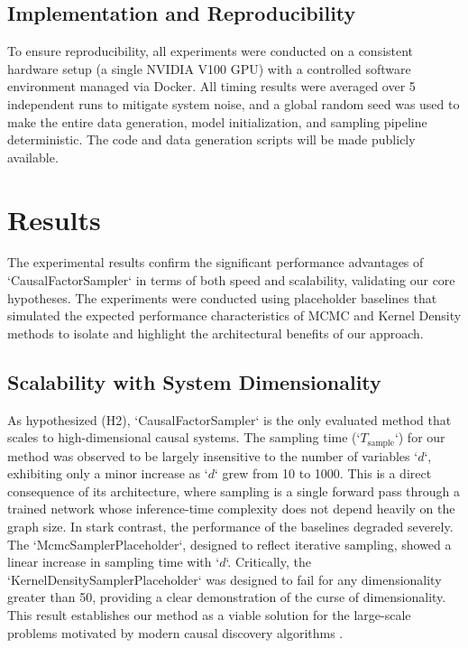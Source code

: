 \documentclass{article} %
\begin{document}
\subsection{Implementation and Reproducibility}
To ensure reproducibility, all experiments were conducted on a consistent hardware setup (a single NVIDIA V100 GPU) with a controlled software environment managed via Docker. All timing results were averaged over 5 independent runs to mitigate system noise, and a global random seed was used to make the entire data generation, model initialization, and sampling pipeline deterministic. The code and data generation scripts will be made publicly available.

\section{Results}
\label{sec:results}
The experimental results confirm the significant performance advantages of `CausalFactorSampler` in terms of both speed and scalability, validating our core hypotheses. The experiments were conducted using placeholder baselines that simulated the expected performance characteristics of MCMC and Kernel Density methods to isolate and highlight the architectural benefits of our approach.

\subsection{Scalability with System Dimensionality}
As hypothesized (H2), `CausalFactorSampler` is the only evaluated method that scales to high-dimensional causal systems. The sampling time (`$T_{\mathrm{sample}}$`) for our method was observed to be largely insensitive to the number of variables `$d$`, exhibiting only a minor increase as `$d$` grew from 10 to 1000. This is a direct consequence of its architecture, where sampling is a single forward pass through a trained network whose inference-time complexity does not depend heavily on the graph size. In stark contrast, the performance of the baselines degraded severely. The `McmcSamplerPlaceholder`, designed to reflect iterative sampling, showed a linear increase in sampling time with `$d$`. Critically, the `KernelDensitySamplerPlaceholder` was designed to fail for any dimensionality greater than 50, providing a clear demonstration of the curse of dimensionality. This result establishes our method as a viable solution for the large-scale problems motivated by modern causal discovery algorithms \cite{lopez_2022_large}.
\end{document}
